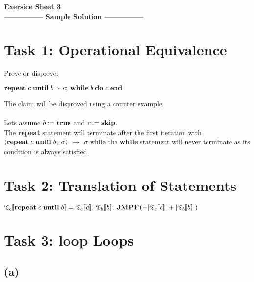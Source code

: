\documentclass[12pt]{scrartcl}
\newcommand{\eState}[2]{$\left\langle \text{#1},\; \text{#2}\right\rangle$}
\newcommand{\eRule}[3]{\eState{#1}{#2} $\rightarrow$ #3}
\newcommand{\lbr}{[\![}
\newcommand{\rbr}{]\!]}
\newcommand{\Tf}{\mathfrak{T}}
\newcommand{\rep}{\text{\textbf{repeat}}}
\newcommand{\un}{\text{\textbf{until}}}
\newcommand{\jmpf}{\text{\textbf{JMPF}}}
\begin{document}
\begin{center}
	\huge\textbf{Exersice Sheet 3}\\[0.5cm]
	
	\Large
	$\mathrel{\vcenter{\hbox{\rule{2cm}{0.5pt}}}}$ \textbf{Sample 				Solution} $\mathrel{\vcenter{\hbox{\rule{2cm}{0.5pt}}}}$\\[1cm]
\end{center}
	\large

	\section*{Task 1: Operational Equivalence}
	
	\indent\indent Prove or disprove:\\
	\begin{center}
		$\text{\textbf{repeat}}\; c\; \text{\textbf{until}}\; b \sim c;\; \text{\textbf{while}}\; b\; \text{\textbf{do}}\; c\; \text{\textbf{end}}$
	\end{center}
	\indent\indent The claim will be disproved using a counter example.\\\\
	\indent Lets assume $b:=\text{\textbf{true}}$ and $c:=\text{\textbf{skip}}$.\\
	\indent The \textbf{repeat} statement will terminate after the first iteration with\\\indent \eRule{$\text{\textbf{repeat}}\; c\; \text{\textbf{until}}\; b$}{$\sigma$}{$\sigma$} while the \textbf{while} statement will never terminate as \indent its condition is always satisfied.
	
	\section*{Task 2: Translation of Statements}

		\begin{center}
			$\Tf_{c}\lbr\rep\;c\;\un\;b\rbr =\Tf_{c}\lbr c\rbr ;\;\Tf_{b}\lbr b\rbr ;\; \jmpf\left(-|\Tf_{c}\lbr c\rbr |+|\Tf_{b}\lbr b\rbr |\right)$
		\end{center}
		
	\section*{Task 3: loop Loops}
	
	\subsection*{(a)}
	
\end{document}
